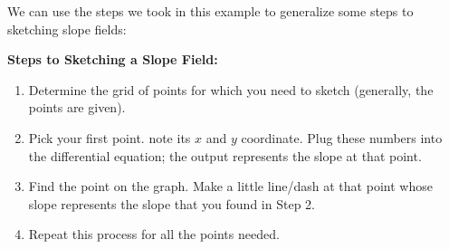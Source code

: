 \begin{tcolorbox}[solution]
\begin{center}
{}
    \end{center}
\end{tcolorbox}

We can use the steps we took in this example to generalize some steps to sketching slope fields: \par

\textbf{Steps to Sketching a Slope Field:} \par

\begin{enumerate}
    \item Determine the grid of points for which you need to sketch (generally, the points are given).
    \item Pick your first point. note its $x$ and $y$ coordinate. Plug these numbers into the differential equation; the output represents the slope at that point.
    \item Find the point on the graph. Make a little line/dash at that point whose slope represents the slope that you found in Step 2.
    \item Repeat this process for all the points needed.
\end{enumerate} 

\bigskip

